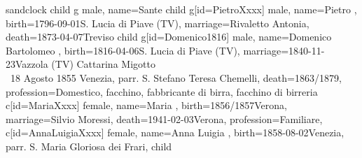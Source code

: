 \documentclass{article}
\begin{document}
\begin{midpage}
\begin{center}

\begin{genealogypicture}[
    processing=database,
    database format=full,
    node size=3.5cm,
    level size=2.8cm,
    level distance=6mm,
    list separators hang=3mm,
    name font=\bfseries,
    surn code={\textcolor{black!50!black}{#1}},
    place text={\newline}{},
    date format=d month yyyy,
    tcbset={male/.style={colframe=blue,colback=blue!5},
    female/.style={colframe=red,colback=red!5}},
    box={fit basedim=7pt,boxsep=2pt,segmentation style=solid,
        halign=left,before upper=\parskip1pt,
        \gtrDBsex,
    },
]
sandclock
{
    child{
        g{
            male,
            name={Sante }
        }
        child{
            g[id=PietroXxxx]{
                male,
                name={Pietro },
                birth={1796-09-01}{S. Lucia di Piave (TV)},
                marriage={Rivaletto Antonia}{},
                death={1873-04-07}{Treviso}
            }
            child{
                g[id=Domenico1816]{
                    male,
                    name={Domenico Bartolomeo },
                    birth={1816-04-06}{S. Lucia di Piave (TV)},
                    marriage={1840-11-23}{Vazzola (TV) \newline Cattarina Migotto \\ \gtrsymMarried~18 Agosto 1855 \newline \hspace*{3mm} Venezia, parr. S. Stefano \newline \hspace*{3mm} Teresa Chemelli},
                    death={1863/1879}{},
                    profession={Domestico, facchino, fabbricante di birra, facchino di birreria}
                }
                c[id=MariaXxxx]{
                    female,
                    name={Maria },
                    birth={1856/1857}{Verona},
                    marriage={Silvio Moressi}{},
                    death={1941-02-03}{Verona},
                    profession={Familiare},
                }
                c[id=AnnaLuigiaXxxx]{
                    female,
                    name={Anna Luigia },
                    birth={1858-08-02}{Venezia, parr. S. Maria Gloriosa dei Frari},
                }
                child{
}}}}}
\end{genealogypicture}
\end{center}
\end{midpage}
\end{document}
